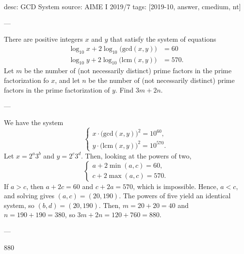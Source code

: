 desc: GCD System
source: AIME I 2019/7
tags: [2019-10, answer, cmedium, nt]

---

There are positive integers $x$ and $y$ that satisfy the system of equations
\begin{align*}
    \log_{10}x+2\log_{10}\big(\text{gcd}(x,y)\big)&=60\\
    \log_{10}y+2\log_{10}\big(\text{lcm}(x,y)\big)&=570.
\end{align*}
Let $m$ be the number of (not necessarily distinct) prime factors in the prime factorization fo $x$, and let $n$ be the number of (not necessarily distinct) prime factors in the prime factorization of $y$. Find $3m+2n$.

---

We have the system \[\begin{cases}x\cdot\big(\text{gcd}(x,y)\big)^2=10^{60},\\ y\cdot\big(\text{lcm}(x,y)\big)^2=10^{570}.\end{cases}\]
Let $x=2^a3^b$ and $y=2^c3^d$. Then, looking at the powers of two, \[\begin{cases}a+2\min(a,c)=60,\\ c+2\max(a,c)=570.\end{cases}\]
If $a>c$, then $a+2c=60$ and $c+2a=570$, which is impossible. Hence, $a<c$, and solving gives $(a,c)=(20,190)$. The powers of five yield an identical system, so $(b,d)=(20,190)$. Then, $m=20+20=40$ and $n=190+190=380$, so $3m+2n=120+760=880$.

---

880
